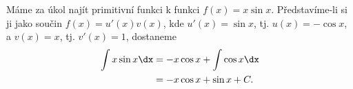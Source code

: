 \begin{mdframed}[style=mdexam]
  \begin{example}\label{MAI:exam111}
    Máme za úkol najít primitivní funkci k funkci \(f(x) = x\sin x\). Představíme-li si ji jako 
    součin \(f(x) = u'(x)v(x)\), kde \(u'(x) = \sin x\), tj. \(u(x) = -\cos x\), a \(v(x)= x\), 
    tj. \(v'(x) = 1\), dostaneme
    \begin{align*}
      \int x\sin x\dx &= -x\cos x + \int\cos x\dx \\
                      &= -x\cos x + \sin x + C.
    \end{align*}    
  \end{example}
\end{mdframed}